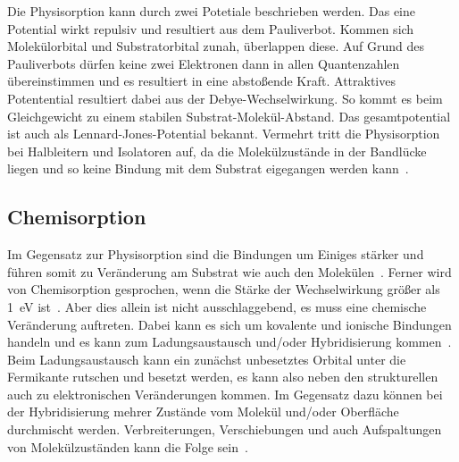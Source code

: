             Die Physisorption kann durch zwei Potetiale beschrieben werden.
            Das eine Potential wirkt repulsiv und resultiert aus dem Pauliverbot.
            Kommen sich Molekülorbital und Substratorbital zunah, überlappen diese.
            Auf Grund des Pauliverbots dürfen keine zwei Elektronen dann in allen Quantenzahlen übereinstimmen und es resultiert in eine abstoßende Kraft.
            Attraktives Potentential resultiert dabei aus der Debye-Wechselwirkung.
            So kommt es beim Gleichgewicht zu einem stabilen Substrat-Molekül-Abstand.
            Das gesamtpotential ist auch als Lennard-Jones-Potential bekannt.
            Vermehrt tritt die Physisorption bei Halbleitern und Isolatoren auf, da die Molekülzustände in der Bandlücke liegen und so keine Bindung mit dem Substrat eigegangen werden kann~\cite{IF_1}.
        
        \subsection{Chemisorption}
            Im Gegensatz zur Physisorption sind die Bindungen um Einiges stärker und führen somit zu Veränderung am Substrat wie auch den Molekülen~\cite{bergenti_spinterface_2019}.
            Ferner wird von Chemisorption gesprochen, wenn die Stärke der Wechselwirkung größer als \SI{1}{\electronvolt} ist~\cite{muscat_chemisorption_1978}.
            Aber dies allein ist nicht ausschlaggebend, es muss eine chemische Veränderung auftreten.
            Dabei kann es sich um kovalente und ionische Bindungen handeln und es kann zum Ladungsaustausch und/oder Hybridisierung kommen~\cite{harutyunyan_hybridisation_2013}.
            Beim Ladungsaustausch kann ein zunächst unbesetztes Orbital unter die Fermikante rutschen und besetzt werden, es kann also neben den strukturellen auch zu elektronischen Veränderungen kommen.
            Im Gegensatz dazu können bei der Hybridisierung mehrer Zustände vom Molekül und/oder Oberfläche durchmischt werden.
            Verbreiterungen, Verschiebungen und auch Aufspaltungen von Molekülzuständen kann die Folge sein~\cite{IF_1}.

